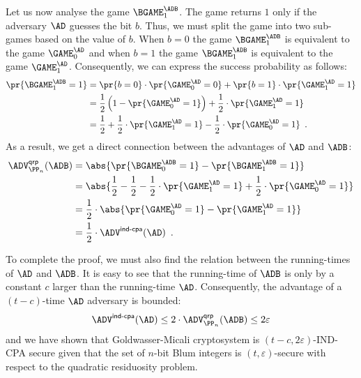 \documentclass{crypto-exercise}
\begin{document}
\begin{solution}
Let us now analyse the game $\BGAME_1^\ADB$. The game returns $1$ only if the adversary $\AD$ guesses the bit $b$. Thus, we must split the game into two sub-games based on the value of $b$. When $b=0$ the game $\BGAME_1^\ADB$ is equivalent to the game $\GAME_0^\AD$ and when $b=1$ the game $\BGAME_1^\ADB$ is equivalent to the game $\GAME_1^\AD$. Consequently, we can express the success probability as follows:
\begin{align*}
\pr{\BGAME_1^\ADB = 1} &= \pr{b = 0}\cdot\pr{\GAME_0^\AD = 0} + \pr{b = 1}\cdot\pr{\GAME_1^\AD = 1} \\
&= \frac{1}{2}\left(1 - \pr{\GAME_0^\AD = 1}\right) + \frac{1}{2}\cdot\pr{\GAME_1^\AD = 1} \\ 
&= \frac{1}{2} + \frac{1}{2}\cdot\pr{\GAME_1^\AD = 1} - \frac{1}{2}\cdot\pr{\GAME_0^\AD = 1} \enspace.
\end{align*}
As a result, we get a direct connection between the advantages of $\AD$ and $\ADB$:
\begin{align*}
\advQRPXX{\PP_n}{\ADB}&=\abs{\pr{\BGAME_0^\ADB = 1} - \pr{\BGAME_1^\ADB = 1}}\\
 &= \abs{\frac{1}{2} - \frac{1}{2} - \frac{1}{2}\cdot\pr{\GAME_1^\AD = 1} + \frac{1}{2}\cdot\pr{\GAME_0^\AD = 1}}\\
 &= \frac{1}{2}\cdot\abs{\pr{\GAME_0^\AD = 1} - \pr{\GAME_1^\AD = 1} }\\
 &= \frac{1}{2}\cdot\advINDCPAXX{}{\AD}\enspace.
\end{align*}

To complete the proof, we must also find the relation between the running-times of $\AD$ and $\ADB$. It is easy to see that the running-time of $\ADB$ is only by a constant $c$ larger than the running-time $\AD$. Consequently, the advantage of a $(t-c)$-time $\AD$ adversary is bounded:
\begin{align*}
\advINDCPAXX{}{\AD} \leq 2 \cdot \advQRPXX{\PP_n}{\ADB}\leq 2\varepsilon 
\end{align*}
and we have shown that Goldwasser-Micali cryptosystem is $(t-c,2\varepsilon)$-IND-CPA secure given that the set of $n$-bit Blum integers is $(t,\varepsilon)$-secure with respect to the quadratic residuosity problem.

\end{solution}
\end{document}
